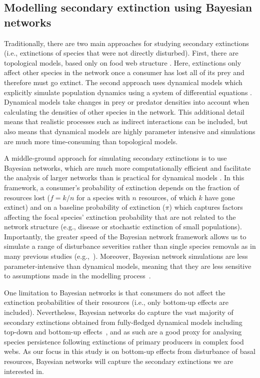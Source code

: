 \documentclass[12pt]{article}
\begin{document}
\begin{spacing}{2.0}
    \subsection*{Modelling secondary extinction using Bayesian networks}


        Traditionally, there are two main approaches for studying secondary extinctions (i.e., extinctions of species that were not directly disturbed). 
        First, there are topological models, based only on food web structure \citep{dunne2009cascading}. 
        Here, extinctions only affect other species in the network once a consumer has lost all of its prey and therefore must go extinct. 
        The second approach uses dynamical models which explicitly simulate population dynamics using a system of differential equations \citep{binzer2011susceptibility}. 
        Dynamical models take changes in prey or predator densities into account when calculating the densities of other species in the network. 
        This additional detail means that realistic processes such as indirect interactions can be included, but also means that dynamical models are highly parameter intensive and simulations are much more time-consuming than topological models. 
        
        
        A middle‐ground approach for simulating secondary extinctions is to use Bayesian networks, which are much more computationally efficient and facilitate the analysis of larger networks than is practical for dynamical models \citep{Eklof2013,Haussler2020}. 
        In this framework, a consumer's probability of extinction depends on the fraction of resources lost ($f = k/n$ for a species with $n$ resources, of which $k$ have gone extinct) and on a baseline probability of extinction ($\pi$) which captures factors affecting the focal species' extinction probability that are not related to the network structure (e.g., disease or stochastic extinction of small populations).
        Importantly, the greater speed of the Bayesian network framework allows us to simulate a range of disturbance severities rather than single species removals as in many previous studies (e.g.,~\citealp[]{Memmott2004,Staniczenko2010,Dunne2004,Cirtwill2022Oikos}).
        Moreover, Bayesian network simulations are less parameter-intensive than dynamical models, meaning that they are less sensitive to assumptions made in the modelling process~\citep{Eklof2013}.

        One limitation to Bayesian networks is that consumers do not affect the extinction probabilities of their resources (i.e., only bottom-up effects are included).
        Nevertheless, Bayesian networks do capture the vast majority of secondary extinctions obtained from fully-fledged dynamical models including top-down and bottom-up effects~\citep{Eklof2013}, and as such are a good proxy for analysing species persistence following extinctions of primary producers in complex food webs.
        As our focus in this study is on bottom-up effects from disturbance of basal resources, Bayesian networks will capture the secondary extinctions we are interested in.


\end{spacing}
\end{document}
